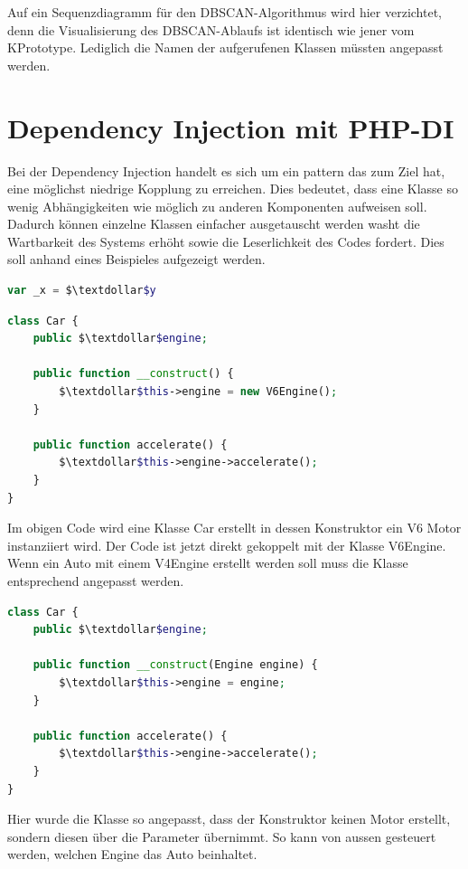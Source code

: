 Auf ein Sequenzdiagramm für den DBSCAN-Algorithmus wird hier verzichtet, denn die Visualisierung des DBSCAN-Ablaufs ist identisch wie jener vom KPrototype. Lediglich die Namen der aufgerufenen Klassen müssten angepasst werden.

\section{Dependency Injection mit PHP-DI}
\label{sec:proofofconcept:dependency-injection}
Bei der Dependency Injection handelt es sich um ein \gls{pattern}
das zum Ziel hat, eine möglichst niedrige Kopplung zu erreichen. Dies bedeutet, dass eine Klasse so wenig Abhängigkeiten wie möglich zu anderen Komponenten aufweisen soll. Dadurch können einzelne Klassen einfacher ausgetauscht werden washt die Wartbarkeit des Systems erhöht sowie die Leserlichkeit des Codes fordert. Dies soll anhand eines Beispieles aufgezeigt werden.

\begin{lstlisting}[language=php]
var _x = $\textdollar$y
\end{lstlisting}

\begin{lstlisting}[language=php]
class Car {
	public $\textdollar$engine;
	
	public function __construct() {
		$\textdollar$this->engine = new V6Engine();
	}
	
	public function accelerate() {
		$\textdollar$this->engine->accelerate();
	}
}
\end{lstlisting}

Im obigen Code wird eine Klasse Car erstellt in dessen Konstruktor ein V6 Motor instanziiert  wird. Der Code ist jetzt direkt gekoppelt mit der Klasse V6Engine. Wenn ein Auto mit einem V4Engine erstellt werden soll muss die Klasse entsprechend angepasst werden. 


\begin{lstlisting}[language=php]
class Car {
	public $\textdollar$engine;
	
	public function __construct(Engine engine) {
		$\textdollar$this->engine = engine;
	}
	
	public function accelerate() {
		$\textdollar$this->engine->accelerate();
	}
}
\end{lstlisting}

Hier wurde die Klasse so angepasst, dass der Konstruktor keinen Motor erstellt, sondern diesen über die Parameter übernimmt. So kann von aussen gesteuert werden, welchen Engine das Auto beinhaltet. 

